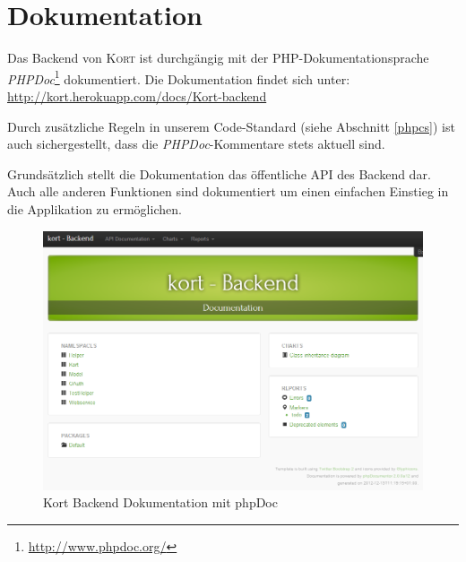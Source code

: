 \section{Dokumentation}

Das Backend von \textsc{Kort} ist durchgängig mit der PHP-Dokumentationsprache \emph{PHPDoc}\footnote{\url{http://www.phpdoc.org/}} dokumentiert.
Die Dokumentation findet sich unter: \url{http://kort.herokuapp.com/docs/Kort-backend}

Durch zusätzliche Regeln in unserem Code-Standard (siehe Abschnitt \ref{phpcs}) ist auch sichergestellt, dass die \emph{PHPDoc}-Kommentare stets aktuell sind.

Grundsätzlich stellt die Dokumentation das öffentliche API des Backend dar.
Auch alle anderen Funktionen sind dokumentiert um einen einfachen Einstieg in die Applikation zu ermöglichen.

\begin{figure}[H]
	\centering
	\includegraphics[width=\textwidth]{images/implementation/backend/kort-backend-documentation}
	\caption{Kort Backend Dokumentation mit phpDoc}
	\label{image-kort-backend-documentation}
\end{figure}
